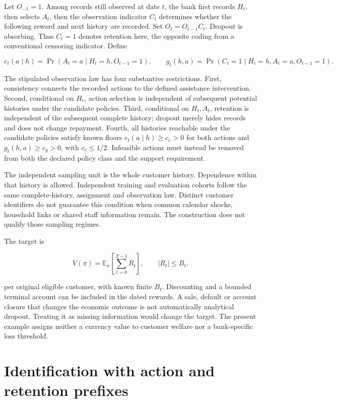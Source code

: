 Let \(O_{-1}=1\). Among records still observed at date \(t\), the bank
first records \(H_t\), then selects \(A_t\), then the observation
indicator \(C_t\) determines whether the following reward and next
history are recorded. Set \(O_t=O_{t-1}C_t\). Dropout is absorbing. Thus
\(C_t=1\) denotes retention here, the opposite coding from a
conventional censoring indicator. Define

\[
 e_t(a\mid h)=\Pr(A_t=a\mid H_t=h,O_{t-1}=1),\qquad
 g_t(h,a)=\Pr(C_t=1\mid H_t=h,A_t=a,O_{t-1}=1).
\]

The stipulated observation law has four substantive restrictions. First,
consistency connects the recorded actions to the defined assistance
intervention. Second, conditional on \(H_t\), action selection is
independent of subsequent potential histories under the candidate
policies. Third, conditional on \(H_t,A_t\), retention is independent of
the subsequent complete history; dropout merely hides records and does
not change repayment. Fourth, all histories reachable under the
candidate policies satisfy known floors \(e_t(a\mid h)\ge c_e>0\) for
both actions and \(g_t(h,a)\ge c_g>0\), with \(c_e\le1/2\). Infeasible
actions must instead be removed from both the declared policy class and
the support requirement.

The independent sampling unit is the whole customer history. Dependence
within that history is allowed. Independent training and evaluation
cohorts follow the same complete-history, assignment and observation
law. Distinct customer identifiers do not guarantee this condition when
common calendar shocks, household links or shared staff information
remain. The construction does not qualify those sampling regimes.

The target is

\[
 V(\pi)=\mathbb E_\pi\left[\sum_{t=0}^{T-1} R_t\right],
 \qquad |R_t|\le B_t,
\]

per original eligible customer, with known finite \(B_t\). Discounting
and a bounded terminal account can be included in the dated rewards. A
sale, default or account closure that changes the economic outcome is
not automatically analytical dropout. Treating it as missing information
would change the target. The present example assigns neither a currency
value to customer welfare nor a bank-specific loss threshold.

\hypertarget{identification-with-action-and-retention-prefixes}{%
\section{Identification with action and retention
prefixes}\label{identification-with-action-and-retention-prefixes}}

